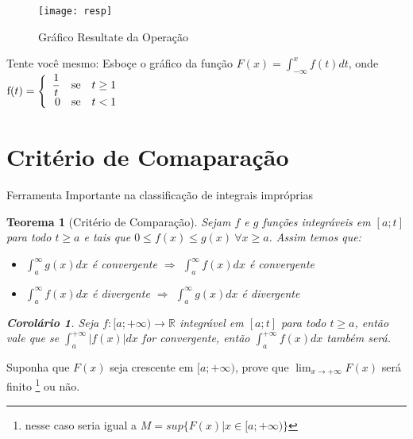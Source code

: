 \documentclass[12pt,openany, letterpaper]{book}
\newtheorem{theorem}{Teorema}[section]
\newtheorem{corollary}{Corolário}[theorem]
\begin{document}
\begin{figure}[ht]
\centering
\texttt{[image: resp]}
\caption{Gráfico Resultate da Operação}
\label{fig:res1}
\end{figure}
\vspace{20pt}

\hspace{5mm}Tente você mesmo: Esboçe o gráfico da função $\displaystyle{F(x) = \int_{-\infty}^x f(t)dt}$, onde $\hbox{f}(t)
= \left\{ \begin{array}{rll}
\displaystyle{\frac{1}{t}} & \hbox{se} &  t \geq 1 \\
0 & \hbox{se} &  t < 1 \\
\end{array}\right.$

\section{Critério de Comaparação}
\label{sec:13}

\hspace{5mm} Ferramenta Importante na classificação de integrais impróprias

\begin{theorem}[Critério de Comparação]
Sejam $f$ e $g$ funções integráveis em $[a;t]$ para todo $t\geq a$ e tais que $0\leq f(x)\leq g(x)\ \forall x \geq a$.  Assim temos que:
\begin{itemize}
\item $\displaystyle{\int_a^{\infty} g(x)dx}$ é convergente $\Rightarrow$ $\displaystyle{\int_a^{\infty} f(x)dx}$ é convergente
\item $\displaystyle{\int_a^{\infty} f(x)dx}$ é divergente $\Rightarrow$ $\displaystyle{\int_a^{\infty} g(x)dx}$ é divergente
\end{itemize}
\vspace{10pt}
\begin{corollary}
Seja $f:[a;+\infty) \rightarrow \mathds{R}$ integrável em $[a;t]$ para todo $t \geq a$, então vale que se $\displaystyle{\int_a^{+\infty}|f(x)| dx}$ for convergente, então $\displaystyle{\int_a^{+\infty} f(x) dx}$ também será.
\end{corollary}
\end{theorem}
\vspace{10pt}

Suponha que $F(x)$ seja crescente em $[a;+\infty)$, prove que $\displaystyle{\lim_{x \rightarrow +\infty} F(x) }$ será finito \footnote{nesse caso seria igual a $M = sup\{F(x)| x \in [a;+\infty)\}$ } ou não.
\end{document}

